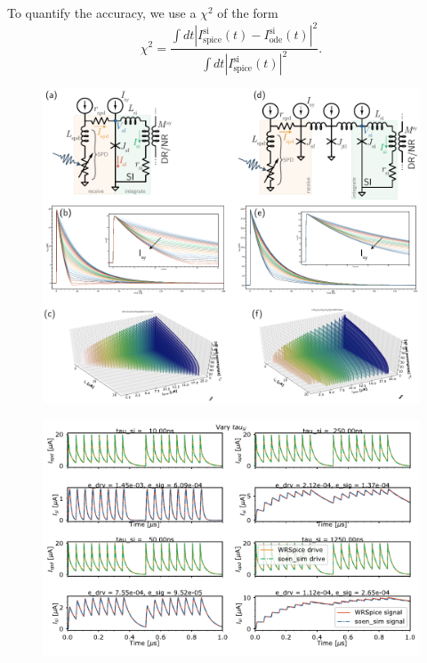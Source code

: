 \documentclass[twocolumn]{article}
\begin{document}
To quantify the accuracy, we use a $\chi^2$ of the form
\begin{equation}
\label{eq:chi_squared}
\chi^2 = \frac{\int dt \left|I^{\mathrm{si}}_{\mathrm{spice}}(t) - I^{\mathrm{si}}_{\mathrm{ode}}(t)\right|^2}{\int dt \left|I^{\mathrm{si}}_{\mathrm{spice}}(t)\right|^2}.
\end{equation}

\begin{figure}[h!]
\includegraphics[width=17.2cm]{figures/_fig__synapses__circuits__responses.pdf}
\end{figure}

\begin{figure}[h!]
\includegraphics[width=17.2cm]{figures/_fig__synapses__comparison__1jj__tau_si.pdf}
\end{figure}
\end{document}
